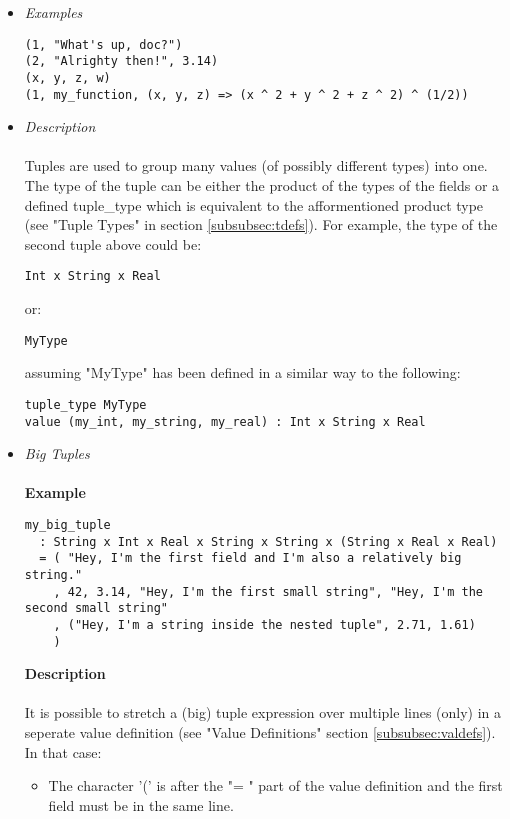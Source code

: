 \documentclass{article}
\begin{document}
\begin{itemize}

\item \textit{Examples}
\begin{verbatim}
(1, "What's up, doc?")
(2, "Alrighty then!", 3.14)
(x, y, z, w)
(1, my_function, (x, y, z) => (x ^ 2 + y ^ 2 + z ^ 2) ^ (1/2))
\end{verbatim}

\item \textit{Description} \\\\
Tuples are used to group many values (of possibly different types) into one.
The type of the tuple can be either the product of the types of the fields or a
defined tuple\_type which is equivalent to the afformentioned product type (see
"Tuple Types" in section \ref{subsubsec:tdefs}). For example, the type of the
second tuple above could be:
\begin{verbatim}
Int x String x Real
\end{verbatim}
or:
\begin{verbatim}
MyType
\end{verbatim}
assuming "MyType" has been defined in a similar way to the following:
\begin{verbatim}
tuple_type MyType
value (my_int, my_string, my_real) : Int x String x Real
\end{verbatim}

\item \textit{Big Tuples} \\\\
\textbf{Example}
\begin{verbatim}
my_big_tuple
  : String x Int x Real x String x String x (String x Real x Real)
  = ( "Hey, I'm the first field and I'm also a relatively big string."
    , 42, 3.14, "Hey, I'm the first small string", "Hey, I'm the second small string"
    , ("Hey, I'm a string inside the nested tuple", 2.71, 1.61)
    )
\end{verbatim}

\textbf{Description} \\\\
It is possible to stretch a (big) tuple expression over multiple lines (only)
in a seperate value definition (see "Value Definitions" section
\ref{subsubsec:valdefs}).  In that case:
\begin{itemize}
\item
The character '(' is after the "= " part of the value definition
and the first field must be in the same line.


\end{itemize}
\end{itemize}
\end{document}
